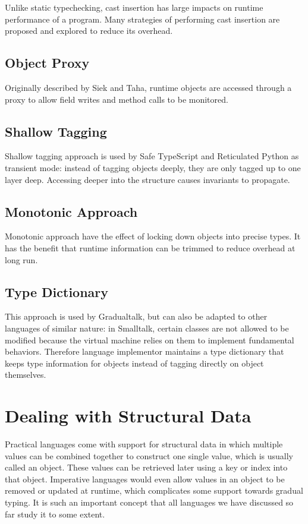 Unlike static typechecking, cast insertion has large impacts on runtime performance of a program.
Many strategies of performing cast insertion are proposed and explored to reduce its overhead.

\subsection{Object Proxy}

Originally described by Siek and Taha, runtime objects are accessed through a proxy to
allow field writes and method calls to be monitored.

\subsection{Shallow Tagging}

Shallow tagging approach is used by Safe TypeScript and Reticulated Python as transient mode:
instead of tagging objects deeply, they are only tagged up to one layer deep. Accessing deeper 
into the structure causes invariants to propagate.

\subsection{Monotonic Approach}

Monotonic approach have the effect of locking down objects into precise types.
It has the benefit that runtime information can be trimmed to reduce overhead at long run.

\subsection{Type Dictionary}

This approach is used by Gradualtalk, but can also be adapted to other languages of similar nature:
in Smalltalk, certain classes are not allowed to be modified because
the virtual machine relies on them to implement fundamental behaviors.
Therefore language implementor maintains a type dictionary that keeps type information for objects
instead of tagging directly on object themselves.

\section{Dealing with Structural Data}

Practical languages come with support for structural data in which multiple values
can be combined together to construct one single value, which is usually called an object.
These values can be retrieved later using a key or index into that object.
Imperative languages would even allow values in an object to be removed or updated at runtime,
which complicates some support towards gradual typing.
It is such an important concept that all languages we have discussed so far study
it to some extent.


